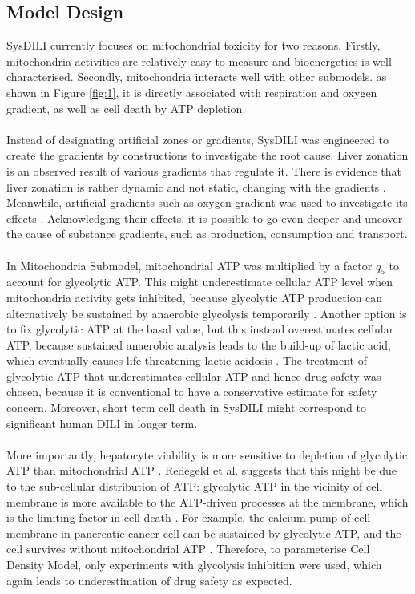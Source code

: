 \documentclass[12pt]{article}
\begin{document}
\subsection{Model Design}
SysDILI currently focuses on mitochondrial toxicity for two reasons. Firstly, mitochondria activities are relatively easy to measure and bioenergetics is well characterised. Secondly, mitochondria interacts well with other submodels. as shown in Figure \ref{fig:1}, it is directly associated with respiration and oxygen gradient, as well as cell death by ATP depletion.\\\\
Instead of designating artificial zones or gradients, SysDILI was engineered to create the gradients by constructions to investigate the root cause. Liver zonation is an observed result of various gradients that regulate it. There is evidence that liver zonation is rather dynamic and not static, changing with the gradients \cite{kietzmannMetabolicZonationLiver2017a}. Meanwhile, artificial gradients such as oxygen gradient was used to investigate its effects \cite{kangMetabolicPatterningChip2018}. Acknowledging their effects, it is possible to go even deeper and uncover the cause of substance gradients, such as production, consumption and transport.\\\\
In Mitochondria Submodel, mitochondrial ATP was multiplied by a factor $q_5$ to account for glycolytic ATP. This might underestimate  cellular ATP level when mitochondria activity gets inhibited, because glycolytic ATP production can alternatively be sustained by anaerobic glycolysis temporarily \cite{harrisEnergyMetabolismGlycolysis2019}. Another option is to fix glycolytic ATP at the basal value, but this instead overestimates cellular ATP, because sustained anaerobic analysis leads to the build-up of lactic acid, which eventually causes life-threatening lactic acidosis \cite{harrisEnergyMetabolismGlycolysis2019}. The treatment of glycolytic ATP that underestimates cellular ATP and hence drug safety was chosen, because it is conventional to have a conservative estimate for safety concern. Moreover, short term cell death in SysDILI might correspond to significant human DILI in longer term.\\\\
More importantly, hepatocyte viability is more sensitive to depletion of glycolytic ATP than mitochondrial ATP \cite{redegeldDepletionATPNot1992}. Redegeld et al. suggests that this might be due to the sub-cellular distribution of ATP: glycolytic ATP in the vicinity of cell membrane is more available to the ATP-driven processes at the membrane, which is the limiting factor in cell death \cite{jonesIntracellularDiffusionGradients1986}. For example, the calcium pump of cell membrane in pancreatic cancer cell can be sustained by glycolytic ATP, and the cell survives without mitochondrial ATP \cite{jamesGlycolyticATPFuels2013a}. Therefore, to parameterise Cell Density Model, only experiments with glycolysis inhibition were used, which again leads to underestimation of drug safety as expected.
\end{document}
